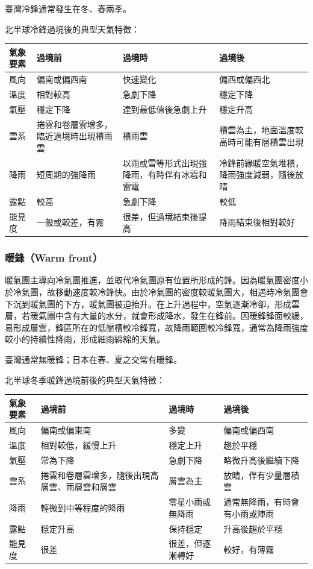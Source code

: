 \documentclass[a4paper,12pt]{report}
\begin{document}
\begin{itemize}
臺灣冷鋒通常發生在冬、春兩季。

北半球冷鋒過境後的典型天氣特徵：
\begin{longtable}[c]{|p{}|p{}|p{}|p{}|}
\hline
氣象要素 & 過境前 & 過境時 & 過境後 \\ \hline
風向 & 偏南或偏西南 & 快速變化 & 偏西或偏西北 \\ \hline
溫度 & 相對較高 & 急劇下降 & 穩定下降 \\ \hline
氣壓 & 穩定下降 & 達到最低值後急劇上升 & 穩定升高 \\ \hline
雲系 & 捲雲和卷層雲增多，臨近過境時出現積雨雲 & 積雨雲 & 積雲為主，地面溫度較高時可能有層積雲出現 \\ \hline
降雨 & 短周期的強降雨 & 以雨或雪等形式出現強降雨，有時伴有冰雹和雷電 & 冷鋒前緣暖空氣堆積，降雨強度減弱，隨後放晴 \\ \hline
露點 & 較高 & 急劇下降 & 較低 \\ \hline
能見度 & 一般或較差，有霧 & 很差，但過境結束後提高 & 降雨結束後相對較好 \\ \hline
\end{longtable}
\subsubsection{暖鋒（Warm front）}
暖氣團主導向冷氣團推進，並取代冷氣團原有位置所形成的鋒。因為暖氣團密度小於冷氣團，故移動速度較冷鋒快。由於冷氣團的密度較暖氣團大，相遇時冷氣團會下沉到暖氣團的下方，暖氣團被迫抬升。在上升過程中，空氣逐漸冷卻，形成雲層，若暖氣團中含有大量的水分，就會形成降水，發生在鋒前。因暖鋒鋒面較緩，易形成層雲，鋒區所在的低壓槽較冷鋒寬，故降雨範圍較冷鋒寬，通常為降雨強度較小的持續性降雨，形成細雨綿綿的天氣。

臺灣通常無暖鋒；日本在春、夏之交常有暖鋒。

北半球冬季暖鋒過境前後的典型天氣特徵：
\begin{longtable}[c]{|p{}|p{}|p{}|p{}|}
\hline
氣象要素 & 過境前 & 過境時 & 過境後 \\ \hline
風向 & 偏南或偏東南 & 多變 & 偏南或偏西南 \\ \hline
溫度 & 相對較低，緩慢上升 & 穩定上升 & 趨於平穩 \\ \hline
氣壓 & 常為下降 & 急劇下降 & 略微升高後繼續下降 \\ \hline
雲系 & 捲雲和卷層雲增多，隨後出現高層雲、雨層雲和層雲 & 層雲為主 & 放晴，伴有少量層積雲 \\ \hline
降雨 & 輕微到中等程度的降雨 & 零星小雨或無降雨 & 通常無降雨，有時會有小雨或陣雨 \\ \hline
露點 & 穩定升高 & 保持穩定 & 升高後趨於平穩 \\ \hline
能見度 & 很差 & 很差，但逐漸轉好 & 較好，有薄霧 \\ \hline
\end{longtable}

\end{itemize}
\end{document}
